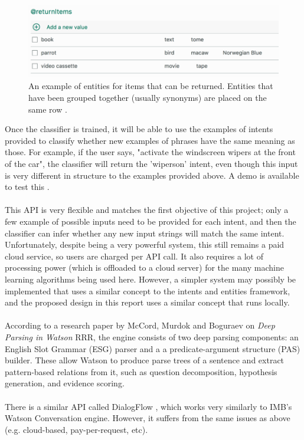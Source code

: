 \documentclass[11pt]{article}
\begin{document}
\begin{center}
\begin{figure}[H]
  \includegraphics[width=\textwidth]{returnitems.png}
  \caption{An example of entities for items that can be returned. Entities that have been grouped together (usually synonyms) are placed on the same row \cite{RefWorks:34}.}
\end{figure}
\end{center}
Once the classifier is trained, it will be able to use the examples of intents provided to classify whether new examples of phrases have the same meaning as those. For example, if the user says, "activate the windscreen wipers at the front of the car", the classifier will return the 'wipers\textunderscore on' intent, even though this input is very different in structure to the examples provided above. A demo is available to test this \cite{RefWorks:32}.
\\
\\
This API is very flexible and matches the first objective of this project; only a few example of possible inputs need to be provided for each intent, and then the classifier can infer whether any new input strings will match the same intent. Unfortunately, despite being a very powerful system, this still remains a paid cloud service, so users are charged per API call. It also requires a lot of processing power (which is offloaded to a cloud server) for the many machine learning algorithms being used here. However, a simpler system may possibly be implemented that uses a similar concept to the intents and entities framework, and the proposed design in this report uses a similar concept that runs locally.
\\
\\
According to a research paper by McCord, Murdok and Boguraev on \textit{Deep Parsing in Watson} RRR, the engine consists of two deep parsing components: an English Slot Grammar (ESG) parser and a a predicate-argument structure (PAS) builder. These allow Watson to produce parse trees of a sentence and extract pattern-based relations from it, such as question decomposition, hypothesis generation, and evidence scoring.
\\
\\
There is a similar API called DialogFlow \cite{RefWorks:106}, which works very similarly to IMB's Watson Conversation engine. However, it suffers from the same issues as above (e.g. cloud-based, pay-per-request, etc).
\end{document}
